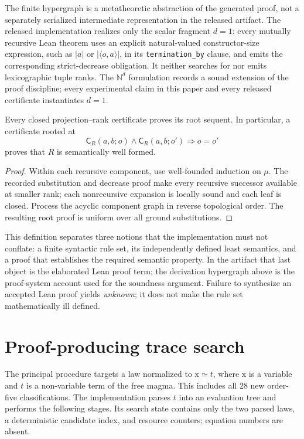 \documentclass[runningheads]{llncs}
\newcommand{\Code}{\mathsf{C}}
\newcommand{\pair}[2]{\langle #1,#2\rangle}
\begin{document}
The finite hypergraph is a metatheoretic abstraction of the generated proof,
not a separately serialized intermediate representation in the released
artifact.  The released implementation realizes only the scalar fragment
$d=1$: every mutually recursive Lean theorem uses an explicit
natural-valued constructor-size expression, such as $|a|$ or
$|\pair{o}{a}|$, in its \texttt{termination\_by} clause, and emits the
corresponding strict-decrease obligation.  It neither searches for nor emits
lexicographic tuple ranks.  The $\mathbb N^d$ formulation records a sound
extension of the proof discipline; every experimental claim in this paper and
every released certificate instantiates $d=1$.

\begin{proposition}
\label{prop:rank-certificate-sound}
Every closed projection--rank certificate proves its root sequent.  In
particular, a certificate rooted at
\[
 \Code_R(a,b;o)\land\Code_R(a,b;o')\Longrightarrow o=o'
\]
proves that $R$ is semantically well formed.
\end{proposition}

\begin{proof}
Within each recursive component, use well-founded induction on \(\mu\).  The
recorded substitution and decrease proof make every recursive successor
available at smaller rank; each nonrecursive expansion is locally sound and
each leaf is closed.  Process the acyclic component graph in reverse
topological order.  The resulting root proof is uniform over all ground
substitutions.
\end{proof}

This definition separates three notions that the implementation must not
conflate: a finite syntactic rule set, its independently defined least
semantics, and a proof that establishes the required semantic property.  In
the artifact that last object is the elaborated Lean proof term; the derivation
hypergraph above is the proof-system account used for the soundness argument.
Failure to synthesize an accepted Lean proof yields \emph{unknown}; it does not
make the rule set mathematically ill defined.

\section{Proof-producing trace search}
\label{sec:search}

The principal procedure targets a law normalized to
\(\mathrm{x}\simeq t\), where \(\mathrm{x}\) is a variable and $t$
is a non-variable term of the free magma.  This includes all 28 new order-five
classifications.  The implementation parses $t$ into an evaluation tree and
performs the following stages.  Its search state contains only the two parsed
laws, a deterministic candidate index, and resource counters; equation numbers
are absent.
\end{document}
